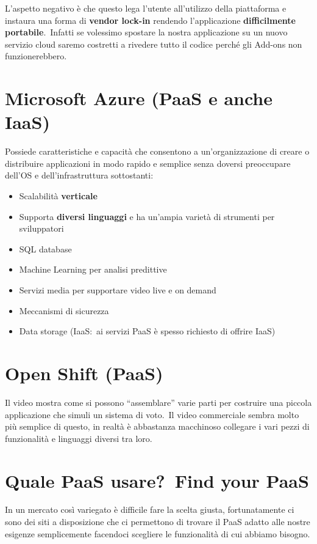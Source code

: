L'aspetto negativo è che questo lega l'utente all'utilizzo della piattaforma e instaura una forma di \textbf{vendor lock-in} rendendo l'applicazione \textbf{difficilmente portabile}.\
Infatti se volessimo spostare la nostra applicazione su un nuovo servizio cloud saremo costretti a rivedere tutto il codice perché gli Add-ons non funzionerebbero.

\section{Microsoft Azure (PaaS e anche IaaS)}
Possiede caratteristiche e capacità che consentono a un'organizzazione di creare o distribuire applicazioni in modo rapido e semplice senza doversi preoccupare dell'OS e dell'infrastruttura sottostanti:

\begin{itemize}
    \item Scalabilità \textbf{verticale}
    \item Supporta \textbf{diversi linguaggi} e ha un'ampia varietà di strumenti per sviluppatori
    \item SQL database
    \item Machine Learning per analisi predittive
    \item Servizi media per supportare video live e on demand
    \item Meccanismi di sicurezza
    \item Data storage (IaaS:\ ai servizi PaaS è spesso richiesto di offrire IaaS)
\end{itemize}

\section{Open Shift (PaaS)}

Il video mostra come si possono ``assemblare'' varie parti per costruire una piccola applicazione che simuli un sistema di voto.\
Il video commerciale sembra molto più semplice di questo, in realtà è abbastanza macchinoso collegare i vari pezzi di funzionalità e linguaggi diversi tra loro.\

\section{Quale PaaS usare?\ Find your PaaS}
In un mercato così variegato è difficile fare la scelta giusta, fortunatamente ci sono dei siti a disposizione che ci permettono di trovare il PaaS adatto alle nostre esigenze semplicemente facendoci scegliere le funzionalità di cui abbiamo bisogno.

